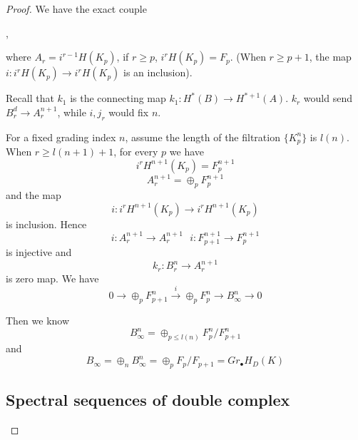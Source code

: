 \documentclass[11pt]{article}
\newcommand{\lrta}{\longrightarrow}
\begin{document}
\begin{proof}
We have the exact couple
\begin{center}
,
\end{center}
where $A_r=i^{r-1}H(K_p)$, if $r\geq p$, $i^rH(K_p)=F_p$. (When $r\geq p+1$, the map $i:i^rH(K_p)\lrta i^rH(K_p)$ is an inclusion).

Recall that $k_1$ is the connecting map $k_1:H^{*}(B)\lrta H^{*+1}(A)$. $k_r$ would send $B_r^d\lrta A_r^{n+1}$, while $i,j_r$ would fix $n$.

For a fixed grading index $n$, assume the length of the filtration $\{K_p^n\}$ is $l(n)$. When $r\geq l(n+1)+1$, for every $p$ we have
$$
i^rH^{n+1}(K_p)=F_p^{n+1}
$$
$$
A_r^{n+1}=\oplus_p F_p^{n+1}
$$
and the map
$$
i: i^rH^{n+1}(K_p)\lrta i^rH^{n+1}(K_p)
$$
is inclusion. Hence 
$$
i:A_r^{n+1}\lrta A_r^{n+1}\ \ \ i:F_{p+1}^{n+1}\lrta F_{p}^{n+1}
$$
is injective and 
$$
k_r:B_r^{n}\lrta A_r^{n+1}
$$
is zero map. We have
$$
0\lrta \oplus_p F_{p+1}^{n}\overset{i}{\lrta} \oplus_p F_{p}^{n}\lrta B_\infty^n\lrta 0 
$$

Then we know
$$
B_\infty^n=\oplus_{p\leq l(n)}F^{n}_p/F^n_{p+1}
$$
and 
$$
B_\infty=\oplus_n B_\infty^n=\oplus_p F_p/F_{p+1}=Gr_\bullet H_D(K)
$$

\subsection{Spectral sequences of double complex}
\end{proof}
\end{document}
